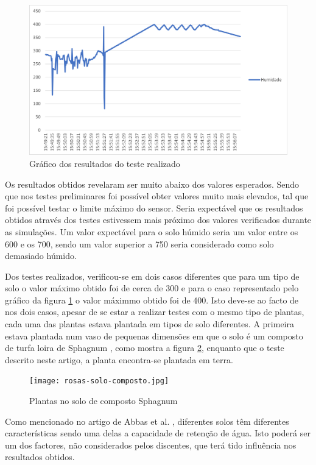 \documentclass[conference]{IEEEtran}
\begin{document}
\begin{figure}
    \centering
    \includegraphics[scale=0.5]{humidity-test-graph.png}
    \caption{Gráfico dos resultados do teste realizado}
    \label{fig:graphic}
\end{figure}

Os resultados obtidos revelaram ser muito abaixo dos valores esperados. Sendo que nos testes preliminares 
foi possível obter valores muito mais elevados, tal que foi possível testar o limite máximo do sensor. Seria 
expectável que os resultados obtidos através dos testes estivessem mais próximo dos valores verificados 
durante as simulações. Um valor expectável para o solo húmido seria um valor entre os 600 e os 700, sendo 
um valor superior a 750 seria considerado como solo demasiado húmido.

Dos testes realizados, verificou-se em dois casos diferentes que para um tipo de solo o valor máximo obtido foi 
de cerca de 300 e para o caso representado pelo gráfico da figura \ref{fig:graphic} o valor máximmo 
obtido foi de 400.
Isto deve-se ao facto de nos dois casos, apesar de se estar a realizar testes com o mesmo tipo de plantas, 
cada uma das plantas estava plantada em tipos de solo diferentes. A primeira estava plantada num vaso de 
pequenas dimensões em que o solo é um composto de turfa loira de Sphagnum \cite{jardinssintra}, 
como mostra a figura \ref{fig:testconditions}, enquanto que o teste descrito neste artigo, 
a planta encontra-se plantada em terra. 

\begin{figure}[h]
    \centering
    \texttt{[image: rosas-solo-composto.jpg]}
    \caption{Plantas no solo de composto Sphagnum}
    \label{fig:testconditions}
\end{figure}

Como mencionado no artigo de Abbas et al. \cite{abbas2014smart}, diferentes solos têm diferentes características 
sendo uma delas a capacidade de retenção de água. Isto poderá ser um dos factores, não considerados pelos 
discentes, que terá tido influência nos resultados obtidos.
\end{document}
